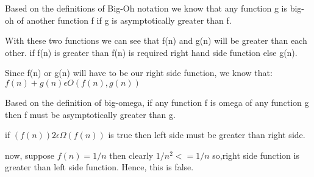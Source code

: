 \documentclass[11pt]{article}
\begin{document}
\begin{questions}

\begin{solutionorbox}
	  Based on the definitions of Big-Oh notation we know that any function g is big-oh of another function f if g is asymptotically greater than f.
	
	With these two functions we can see that f(n) and g(n) will be greater than each other. if f(n) is greater than f(n) is required right hand side function else g(n).
	
	Since f(n) or g(n) will have to be our right side function, we know that:$ f(n) + g(n) \epsilon O(f(n),g(n))$ \newline
	
	Based on the definition of big-omega, if any function f is omega of any function g then f must be asymptotically greater than g.\newline
	
	if $(f(n))2\epsilon\Omega(f(n))$ is true then left side must be greater than right side.
	
	now, suppose $f(n) = 1/n$ then clearly $1/n^2 <= 1/n$ so,right side function is greater than left side function.
	\newline
	Hence, this is false.
\end{solutionorbox}

\ifprintanswers
\newpage
\else
\bigskip
\fi


%
\end{questions}
\end{document}
